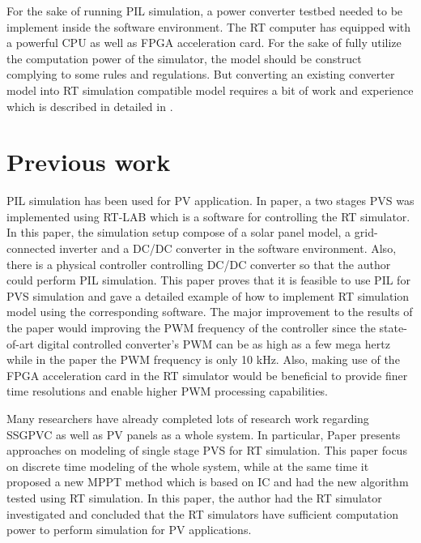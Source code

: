 For the sake of running \gls{PIL} simulation, a power converter testbed needed to be implement inside the software environment. The \gls{RT} computer has equipped with a powerful \gls{CPU} as well as \gls{FPGA} acceleration card. For the sake of fully utilize the computation power of the simulator, the model should be construct complying to some rules and regulations. But converting an existing converter model into \gls{RT} simulation compatible model requires a bit of work and experience which is described in detailed in .

\section{Previous work}
\gls{PIL} simulation has been used for \gls{PV} application. In paper,\cite{RN11} a two stages \gls{PVS} was implemented using RT-LAB which is a software for controlling the \gls{RT} simulator. In this paper, the simulation setup compose of a solar panel model, a grid-connected inverter and a DC/DC converter in the software environment. Also, there is a physical controller controlling DC/DC converter so that the author could perform \gls{PIL} simulation. This paper proves that it is feasible to use \gls{PIL} for \gls{PVS} simulation and gave a detailed example of how to implement \gls{RT} simulation model using the corresponding software. The major improvement to the results of the paper would improving the \gls{PWM} frequency of the controller since the state-of-art digital controlled converter's \gls{PWM} can be as high as a few mega hertz while in the paper the \gls{PWM} frequency is only 10 kHz. Also, making use of the \gls{FPGA} acceleration card in the \gls{RT} simulator would be beneficial to provide finer time resolutions and enable higher \gls{PWM} processing capabilities.

Many researchers have already completed lots of research work regarding \gls{SSGPVC} as well as PV panels as a whole system. In particular, Paper \cite{RN3} presents approaches on modeling of single stage \gls{PVS} for \gls{RT} simulation. This paper focus on discrete time modeling of the whole system, while at the same time it proposed a new MPPT method which is based on \gls{IC} and had the new algorithm tested using \gls{RT} simulation. In this paper, the author had the \gls{RT} simulator investigated and concluded that the \gls{RT} simulators have sufficient computation power to perform simulation for PV applications. 

